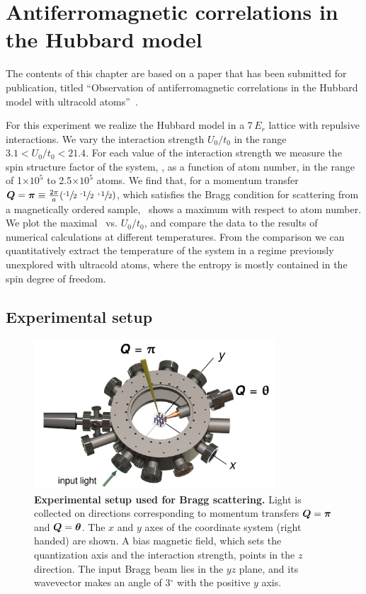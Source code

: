 \chapter{Antiferromagnetic correlations in the Hubbard model}
\label{chap:afmbragg}

The contents of this chapter are based on  a paper that has been submitted for
publication, titled ``Observation of antiferromagnetic correlations in the
Hubbard model with ultracold atoms''~\cite{Hart2014arxiv}. 

For this experiment we realize the Hubbard model in a 7\,$E_{r}$ lattice with
repulsive interactions.  We vary the interaction strength $U_{0}/t_{0}$ in the
range $3.1 < U_{0}/t_{0} < 21.4$.  For each value of the interaction strength
we measure the spin structure factor of the system, \sq,  as a function of atom
number, in the range of 1$\times 10^{5}$ to 2.5$\times 10^{5}$ atoms.  We find
that, for a momentum transfer $\bv{Q}=\bv{\pi} \equiv \frac{2\pi}{a}\hhh$,
which  satisfies the Bragg condition for scattering from a magnetically ordered
sample,  \sPi\ shows a maximum with respect to atom number.   We plot the
maximal \sPi\ vs.  $U_{0}/t_{0}$,  and compare the data to the results of
numerical calculations at different temperatures.   From the comparison we can
quantitatively extract the temperature of the system in a regime previously
unexplored with ultracold atoms, where the entropy is mostly contained in the
spin degree of freedom.

\section{Experimental setup}

\begin{figure}
\begin{center}
\includegraphics[width=90mm]{../figures/afmpaper/chamber-setup.png} 
\end{center}
\caption{\textbf{Experimental setup used for Bragg scattering.} Light is
collected on directions corresponding to momentum transfers
$\bm{Q}=\bm{\pi}$ and $\bm{Q}=\bm{\theta}$.  The $x$ and $y$ axes
of the coordinate system (right handed) are shown.  A bias magnetic field,
which sets the quantization axis and the interaction strength, points in the
$z$ direction.   The input Bragg beam lies in the $yz$ plane, and its
wavevector makes an angle of 3$^{\circ}$ with the positive $y$ axis.  }
\label{fig:bfig1}
\end{figure}


